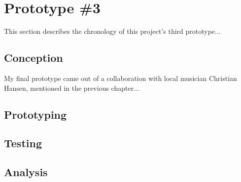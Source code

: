 \chapter{Prototype \#3}

This section describes the chronology of this project's third prototype...

\section{Conception}

My final prototype came out of a collaboration with local musician Christian Hansen, mentioned in the previous chapter...


\section{Prototyping}



\section{Testing}


\section{Analysis}
